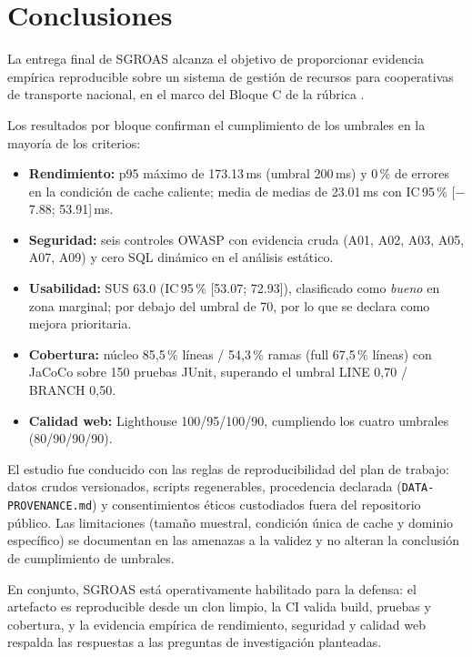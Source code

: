 \chapter{Conclusiones}
\label{cap:conclusiones}

La entrega final de SGROAS alcanza el objetivo de proporcionar evidencia empírica
reproducible sobre un sistema de gestión de recursos para cooperativas de
transporte nacional, en el marco del Bloque C de la rúbrica \cite{uteq2026guia}.

Los resultados por bloque confirman el cumplimiento de los umbrales en la mayoría
de los criterios:
\begin{itemize}
  \item \textbf{Rendimiento:} p95 máximo de 173.13\,ms (umbral 200\,ms) y 0\,\% de
        errores en la condición de cache caliente; media de medias de 23.01\,ms
        con IC\,95\,\% [$-$7.88; 53.91]\,ms.
  \item \textbf{Seguridad:} seis controles OWASP con evidencia cruda (A01, A02,
        A03, A05, A07, A09) y cero SQL dinámico en el análisis estático.
  \item \textbf{Usabilidad:} SUS 63.0 (IC\,95\,\% [53.07; 72.93]), clasificado como
        \emph{bueno} en zona marginal; por debajo del umbral de 70, por lo que se
        declara como mejora prioritaria.
  \item \textbf{Cobertura:} núcleo 85,5\,\% líneas / 54,3\,\% ramas (full 67,5\,\% líneas) con JaCoCo sobre 150 pruebas JUnit, superando el umbral LINE 0,70 / BRANCH 0,50.
  \item \textbf{Calidad web:} Lighthouse 100/95/100/90, cumpliendo los cuatro
        umbrales (80/90/90/90).
\end{itemize}

El estudio fue conducido con las reglas de reproducibilidad del plan de trabajo:
datos crudos versionados, scripts regenerables, procedencia declarada
(\texttt{DATA-PROVENANCE.md}) y consentimientos éticos custodiados fuera del
repositorio público. Las limitaciones (tamaño muestral, condición única de cache y
dominio específico) se documentan en las amenazas a la validez y no alteran la
conclusión de cumplimiento de umbrales.

En conjunto, SGROAS está operativamente habilitado para la defensa: el artefacto
es reproducible desde un clon limpio, la CI valida build, pruebas y cobertura, y la
evidencia empírica de rendimiento, seguridad y calidad web respalda las respuestas
a las preguntas de investigación planteadas.